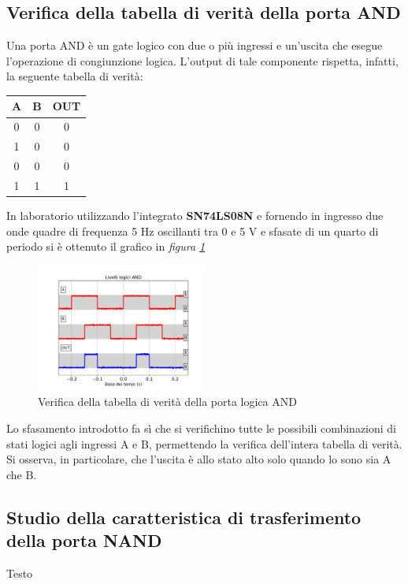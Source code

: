 \documentclass[journal]{IEEEtran}
\begin{document}
\subsection{Verifica della tabella di verità della porta AND}
Una porta AND è un gate logico con due o più ingressi e un'uscita che esegue l'operazione di congiunzione logica. L'output di tale componente rispetta, infatti, la seguente tabella di verità:
\begin{center}
\begin{tabular}{ |c|c|c| } 
 \hline
 A & B & OUT \\ \hline 
 0 & 0 & 0 \\ \hline
 1 & 0 & 0 \\ \hline
 0 & 0 & 0 \\ \hline
 1 & 1 & 1 \\ \hline
 
 \hline
\end{tabular}
\end{center}
In laboratorio utilizzando l'integrato \textbf{SN74LS08N} e fornendo in ingresso due onde quadre di frequenza 5 Hz oscillanti tra 0 e 5 V e sfasate di un quarto di periodo si è ottenuto il grafico in  \textit{figura \ref{fig:AND-table}} 
\begin{figure}[H]%
\begin{center}
\includegraphics[width=0.50\textwidth]{analysis/output/AND-all.pdf}
\caption{Verifica della tabella di verità della porta logica AND}
\label{fig:AND-table}
\end{center}
\end{figure}

Lo sfasamento introdotto fa sì che si verifichino tutte le possibili combinazioni di stati logici agli ingressi A e B, permettendo la verifica dell'intera tabella di verità. Si osserva, in particolare, che l'uscita è allo stato alto solo quando lo sono sia A che B.

\subsection{Studio della caratteristica di trasferimento della porta NAND}
Testo
\end{document}
